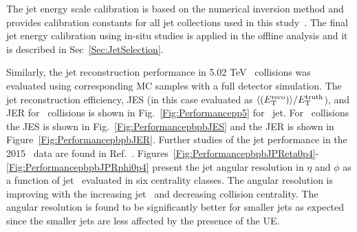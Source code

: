 The jet energy scale calibration is based on the numerical inversion method and provides calibration constants for all jet collections used in this study~\cite{CalibrationTwiki}. The final jet energy calibration using in-situ studies is applied in the offline analysis and it is described in Sec~\ref{Sec:JetSelection}.   



Similarly, the jet reconstruction performance in 5.02 TeV \pp\ collisions was evaluated using corresponding MC samples with a full detector simulation. The jet reconstruction efficiency, JES (in this case evaluated as $\langle (\mbox{$E_{\mathrm{T}}^{\mathrm{reco}}$})\rangle/\mbox{$E_{\mathrm{T}}^{\mathrm{truth}}$}$), and JER for \pp\ collisions is shown in Fig.~\ref{Fig:Performancepp5} for \RFour\ jet.
For \pbpb\ collisions the JES is shown in Fig.~\ref{Fig:PerformancepbpbJES} and the JER is shown
in Figure~\ref{Fig:PerformancepbpbJER}.  Further studies of the jet performance in the 2015 \pbpb\
data are found in Ref.~\cite{PbPbRaaNote}. Figures~\ref{Fig:PerformancepbpbJPReta0p4}-\ref{Fig:PerformancepbpbJPRphi0p4} present the jet angular resolution in $\eta$ and $\phi$ as a function of jet \pt\ evaluated in six centrality classes. The angular resolution is improving with the increasing jet \pT\ and decreasing collision centrality. The angular resolution is found to be significantly better for smaller jets as expected since the smaller jets are less affected by the presence of the UE. 

